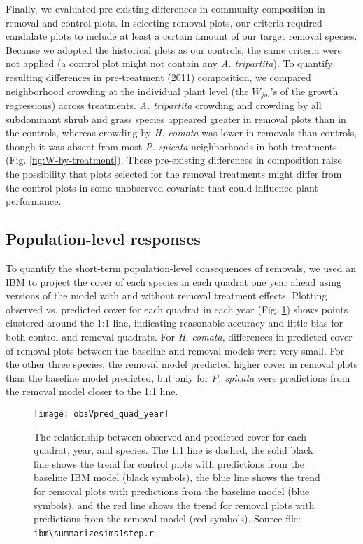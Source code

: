 \documentclass[11pt]{article}
\begin{document}
\begin{doublespacing}
Finally, we evaluated pre-existing differences in community composition in removal and control plots. In selecting removal plots, our criteria required candidate plots to include at least a certain amount of our target removal species. Because we adopted the historical plots as our controls, the same criteria were not applied (a control plot might not contain any \textit{A. tripartita}). To quantify resulting differences in pre-treatment (2011) composition, we compared neighborhood crowding at the individual plant level (the $W_{jm}$'s of the growth regressions) across treatments. \textit{A. tripartita} crowding and crowding by all subdominant shrub and grass species appeared greater in removal plots than in the controls, whereas crowding by \textit{H. comata} was lower in removals than controls, though it was absent from most \textit{P. spicata} neighborhoods in both treatments (Fig. \ref{fig:W-by-treatment}). These pre-existing differences in composition raise the possibility that plots selected for the removal treatments might differ from the control plots in some unobserved covariate that could influence plant performance.

\subsection*{Population-level responses}

To quantify the short-term population-level consequences of removals, we used an IBM to project the cover of each species in each quadrat one year ahead using versions of the model with and without removal treatment effects. Plotting observed vs. predicted cover for each quadrat in each year (Fig. \ref{fig:obsVpred}) shows points clustered around the 1:1 line, indicating reasonable accuracy and little bias for both control and removal quadrats. For \textit{H. comata}, differences in predicted cover of removal plots between the baseline and removal models were very small. For the other three species, the removal model predicted higher cover in removal plots than the baseline model predicted, but only for \textit{P. spicata} were predictions from the removal model closer to the 1:1 line.

 \begin{figure}[tbp]
 \centering
 \texttt{[image: obsVpred\_quad\_year]}
 \caption{The relationship between observed and predicted cover for each quadrat, year, and species. The 1:1 line is dashed, the solid black line shows the trend for control plots with predictions from the baseline IBM model (black symbols), the blue line shows the trend for removal plots with predictions from the baseline model (blue symbols), and the red line shows the trend for removal plots with predictions from the removal model (red symbols). Source file: \texttt{ibm\textbackslash summarize\textunderscore sims1step.r}. }
 \label{fig:obsVpred}
 \end{figure}
 

\end{doublespacing}
\end{document}
